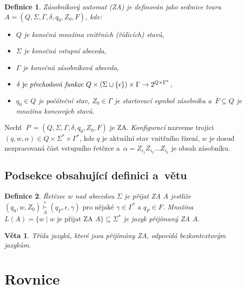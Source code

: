 \documentclass[twocolumn, 11pt, a4paper]{article}
\newtheorem{definition}{Definice}
\newtheorem{sentence}{Věta}
\begin{document}
\begin{definition}
    \label{def1}
    \emph{Zásobníkový automat (ZA)} je definován jako sedmice tvaru \mbox{$ A = (Q, \Sigma, \Gamma, \delta, q_0, Z_0, F) $}, kde:
    \begin{itemize}
        \item $ Q $ je konečná množina \emph{vnitřních (řídicích) stavů,}
        \item $ \Sigma $ je konečná \emph{vstupní abeceda,} 
        \item $ \Gamma $ je konečná \emph{zásobníková abeceda,}
        \item $ \delta \text{ je \emph{přechodová funkce} } Q \times (\Sigma \cup \{\epsilon\}) \times \Gamma \rightarrow 2^{Q \times \Gamma^*}$,
        \item $ q_0 \in Q $ je \emph{počáteční stav,} $ Z_0 \in \Gamma $ je \emph{startovací symbol zásobníku a}~$ F \subseteq Q $ je množina \emph{koncových stavů.} 
    \end{itemize}

\end{definition}
 
Nechť \mbox{$\ P\ = (Q, \Sigma, \Gamma, \delta, q_0, Z_0, F) $} je ZA. \emph{Konfigurací} nazveme trojici $ (q, w, \alpha) \in Q \times \Sigma^* \times \Gamma^* $, kde $ q $ je aktuální stav vnitřního řízení, 
$ w $ je dosud nezpracovaná část vstupního řetězce a~\mbox{$ \alpha = Z_{i_1} Z_{i_2} \ldots Z_{i_k} $} je obsah zásobníku.

\subsection{Podsekce obsahující definici a~větu}

\begin{definition}
    \label{def2}
    \emph{Řetězec $ w $ nad abecedou $ \Sigma $ je přijat ZA $ A $} jestliže \mbox{$ (q_0, w, Z_0) \underset{A}{\overset{*}{\vdash}} (q_F, \epsilon, \gamma) \text{ pro nějaké } \gamma \in \Gamma^* \text{ a } q_F \in F $}.
    Množina \mbox{$ L(A) = \{ w \mid w \text{ je přijat ZA } A \} \subseteq \Sigma^* $} je \emph{jazyk přijímaný ZA} $ A $. 
\end{definition}

\begin{sentence}
    \label{sent1}
    Třída jazyků, které jsou přijímány ZA, odpovídá \emph{bezkontextovým jazykům}.
\end{sentence}

\section{Rovnice}
\end{document}
